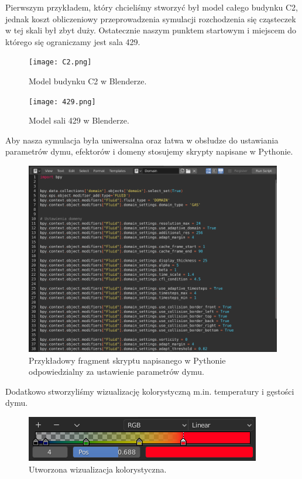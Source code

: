 \documentclass{article}
\begin{document}
	\noindent Pierwszym przykładem, który chcieliśmy stworzyć był model całego budynku C2, jednak koszt obliczeniowy przeprowadzenia symulacji rozchodzenia się cząsteczek w tej skali był zbyt duży. Ostatecznie naszym punktem startowym i miejscem do którego się ograniczamy jest sala 429. 
	
	\begin{figure}
		\centering
		\texttt{[image: C2.png]}
		\caption{Model budynku C2 w Blenderze.}
		
		\vspace{12mm}
		\texttt{[image: 429.png]}
		\caption{Model sali 429 w Blenderze.}
	\end{figure}
	
	\pagebreak
	\medskip
	\vspace{12mm}
	\noindent Aby nasza symulacja była uniwersalna oraz łatwa w obsłudze do ustawiania parametrów dymu, efektorów i domeny stosujemy skrypty napisane w Pythonie.
	\vspace{7mm}
	
	\medskip
	\begin{figure}[ht!]
		\centering
		\includegraphics[scale = 0.6]{sk2.png}
		\caption{Przykładowy fragment skryptu napisanego w Pythonie odpowiedzialny za ustawienie parametrów dymu.}
	\end{figure}
	
	\vspace{15mm}
	\medskip
	\noindent Dodatkowo stworzyliśmy wizualizację kolorystyczną m.in. temperatury i gęstości dymu.
	
	\vspace{4mm}
	\begin{figure}[ht!]
		\centering
		\includegraphics[scale = 1.0]{wizualizacja.png}
		\caption{Utworzona wizualizacja kolorystyczna.}
	\end{figure}
	
\end{document}
